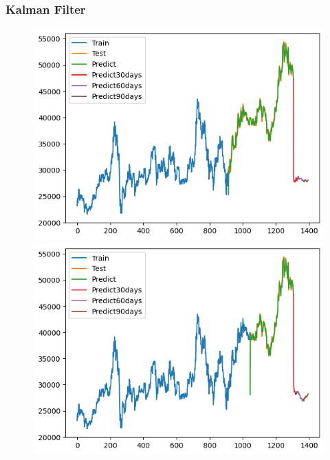 \subsubsection{Kalman Filter}
\begin{figure}[H]
    \centering
    \begin{minipage}{0.15\textwidth}
    \centering
    \includegraphics[width=1\textwidth]{resources/chapter-5/newdata1/result/KF_BIDV_7_3.png}
    \end{minipage}
    \hfill
    \begin{minipage}{0.15\textwidth}
    \centering
    \includegraphics[width=1\textwidth]{resources/chapter-5/newdata1/result/KF_BIDV_8_2.png}
    \end{minipage}
    \hfill
        \begin{minipage}{0.15\textwidth}

\end{minipage}
\end{figure}
